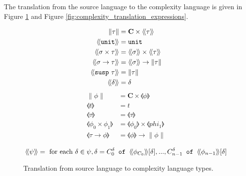 The translation from the source language to the complexity language is given in
Figure \ref{fig:complexity_translation_types} and Figure
\ref{fig:complexity_translation_expressions}.
%
\begin{figure}[H]
  \caption{Translation from source language to complexity language types.}
  \label{fig:complexity_translation_types}
  \begin{align*}
    \|\tau\| &= \textbf{C} \times \llangle \tau \rrangle \\
    \llangle\T{unit}\rrangle &= \T{unit} \\
    \llangle \sigma \times \tau \rrangle &= \llangle \sigma \rrangle \times \llangle \tau \rrangle \\
    \llangle \sigma \rightarrow \tau \rrangle &= \llangle \sigma \rrangle \rightarrow \|\tau\| \\
    \llangle \T{susp}\ \tau \rrangle &= \|\tau\| \\
    \llangle \delta \rrangle &= \delta \\
  \end{align*}
  \begin{align*}
    \|\phi\| &= \textbf{C} \times \llangle \phi \rrangle \\
    \llangle t \rrangle &= t \\
    \llangle \tau \rrangle &= \llangle \tau \rrangle \\
    \llangle \phi_0 \times \phi_1 \rrangle &= \llangle \phi_0 \rrangle \times \llangle phi_1 \rrangle \\
    \llangle \tau \rightarrow \phi \rrangle &= \llangle \phi \rrangle \rightarrow \|\phi\| \\
  \end{align*}
  \begin{align*}
    \langle\!\langle \psi \rangle\!\rangle &= \text{ for each }\delta \in \psi, \delta = C_0^\delta \texttt{ of } \langle\!\langle \phi_{C_0}\rangle\!\rangle[\delta], . . . , C_{n-1}^\delta \texttt{ of } \langle\!\langle \phi_{n-1}\rangle\!\rangle[\delta] \\
  \end{align*}
\end{figure}
%
